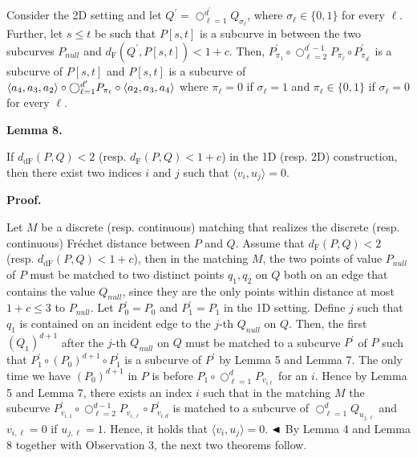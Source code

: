 \documentclass[10pt,a4paper]{article}
\begin{document}
Consider the 2D setting and let $Q^{\prime}=\bigcirc_{\ell=1}^{d^{\prime}}Q_{\sigma_{\ell}}$, where $\sigma_{\ell}\in\{0,1\}$ for every $\ell$. Further, let $s\leq t$ be such that $P[s,t]$ is a subcurve in between the two subcurves $P_{null}$ and $d_{\text{F}}(Q^{\prime},P[s,t])<1+c$. Then, $P_{\pi_{1}}^{\prime}\circ\bigcirc_{\ell=2}^{d^{\prime}-1}P_{\pi_{\ell}}\circ P%
_{\pi_{d^{\prime}}}^{\prime}$ is a subcurve of $P[s,t]$ and $P[s,t]$ is a subcurve of $\langle a_{4},a_{3},a_{2}\rangle\circ\bigcirc_{\ell=1}^{d^{\prime}}P_{\pi_{%
\ell}}\circ\langle a_{2},a_{3},a_{4}\rangle$ where $\pi_{\ell}=0$ if $\sigma_{\ell}=1$ and $\pi_{\ell}\in\{0,1\}$ if $\sigma_{\ell}=0$ for every $\ell$.
\par
\par
\par
\par\medskip\noindent\textbf{Lemma 8.}\par
If $d_{\text{dF}}(P,Q)<2$ (resp. $d_{\text{F}}(P,Q)<1+c$) in the 1D (resp. 2D) construction, then there exist two indices $i$ and $j$ such that $\langle v_{i},u_{j}\rangle=0$.
\par
\par
\par
\par\medskip\noindent\textbf{Proof.}\par
Let $M$ be a discrete (resp. continuous) matching that realizes the discrete (resp. continuous) Fréchet distance between $P$ and $Q$. Assume that $d_{\text{F}}(P,Q)<2$ (resp. $d_{\text{dF}}(P,Q)<1+c$), then in the matching $M$, the two points of value $P_{null}$ of $P$ must be matched to two distinct points $q_{1},q_{2}$ on $Q$ both on an edge that contains the value $Q_{null}$, since they are the only points within distance at most $1+c\leq 3$ to $P_{null}$. Let $P_{0}^{\prime}=P_{0}$ and $P_{1}^{\prime}=P_{1}$ in the 1D setting. Define $j$ such that $q_{1}$ is contained on an incident edge to the $j$-th $Q_{null}$ on $Q$. Then, the first $(Q_{1})^{d+1}$ after the $j$-th $Q_{null}$ on $Q$ must be matched to a subcurve $P^{\prime}$ of $P$ such that $P_{1}^{\prime}\circ(P_{0})^{d+1}\circ P_{1}^{\prime}$ is a subcurve of $P^{\prime}$ by Lemma 5 and Lemma 7. The only time we have $(P_{0})^{d+1}$ in $P$ is before $P_{1}\circ\bigcirc_{\ell=1}^{d}P_{v_{i\ell}}$ for an $i$. Hence by Lemma 5 and Lemma 7, there exists an index $i$ such that in the matching $M$ the subcurve $P^{\prime}_{v_{i,1}}\circ\bigcirc_{\ell=2}^{d-1}P_{v_{i,\ell}}\circ P^{\prime}%
_{v_{i,d}}$ is matched to a subcurve of $\bigcirc_{\ell=1}^{d}Q_{u_{j,\ell}}$ and $v_{i,\ell}=0$ if ${u_{j,\ell}}=1$. Hence, it holds that $\langle v_{i},u_{j}\rangle=0$. $\hfill\blacktriangleleft$ By Lemma 4 and Lemma 8 together with Observation 3, the next two theorems follow.
\par
\par
\end{document}
